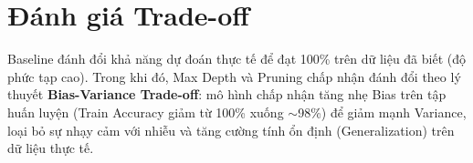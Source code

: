 \section{Đánh giá Trade-off}
Baseline đánh đổi khả năng dự đoán thực tế để đạt 100\% trên dữ liệu đã biết (độ phức tạp cao). Trong khi đó, Max Depth và Pruning chấp nhận đánh đổi theo lý thuyết \textbf{Bias-Variance Trade-off}: mô hình chấp nhận tăng nhẹ Bias trên tập huấn luyện (Train Accuracy giảm từ 100\% xuống $\sim$98\%) để giảm mạnh Variance, loại bỏ sự nhạy cảm với nhiễu và tăng cường tính ổn định (Generalization) trên dữ liệu thực tế.
